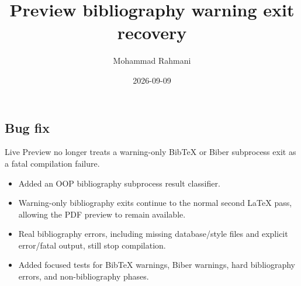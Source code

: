 \documentclass[a4paper]{article}
\title{Preview bibliography warning exit recovery}
\date{2026-09-09}
\author{Mohammad Rahmani}
\begin{document}
   \maketitle

   \begin{preview}
      \section*{Bug fix}
      Live Preview no longer treats a warning-only BibTeX or Biber subprocess
      exit as a fatal compilation failure.

      \begin{itemize}
         \item Added an OOP bibliography subprocess result classifier.
         \item Warning-only bibliography exits continue to the normal second
         LaTeX pass, allowing the PDF preview to remain available.
         \item Real bibliography errors, including missing database/style files
         and explicit error/fatal output, still stop compilation.
         \item Added focused tests for BibTeX warnings, Biber warnings, hard
         bibliography errors, and non-bibliography phases.
      \end{itemize}
   \end{preview}

   
   
\end{document}
